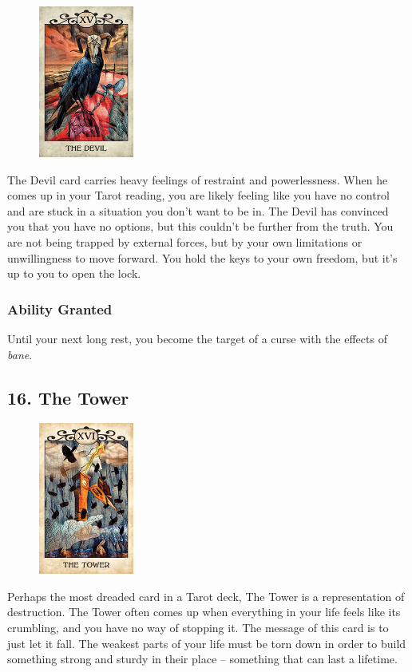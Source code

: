 \documentclass[10pt,twoside,twocolumn,openany,nodeprecatedcode]{dndbook}
\begin{document}
    \begin{figure}
        \includegraphics[height=5cm,width=\linewidth]{devil.jpg}
    \end{figure}
    The Devil card carries heavy feelings of restraint and powerlessness. When he comes up in your Tarot reading, you are likely feeling like you have no control and are stuck in a situation you don't want to be in. The Devil has convinced you that you have no options, but this couldn't be further from the truth. You are not being trapped by external forces, but by your own limitations or unwillingness to move forward. You hold the keys to your own freedom, but it's up to you to open the lock.

    \subsubsection*{Ability Granted}
    Until your next long rest, you become the target of a curse with the effects of \emph{bane}.

    \subsection*{16. The Tower}

    \begin{figure}
        \includegraphics[height=5cm,width=\linewidth]{tower.jpg}
    \end{figure}
    Perhaps the most dreaded card in a Tarot deck, The Tower is a representation of destruction. The Tower often comes up when everything in your life feels like its crumbling, and you have no way of stopping it. The message of this card is to just let it fall. The weakest parts of your life must be torn down in order to build something strong and sturdy in their place -- something that can last a lifetime.
\end{document}
